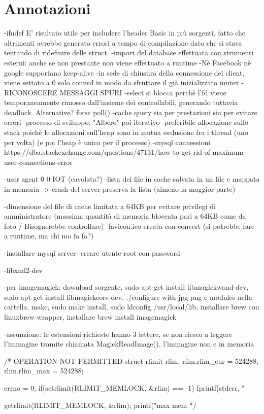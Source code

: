 \documentclass[a4paper, titlepage]{article}
\begin{document}
	\section{Annotazioni}
	\begin{flushleft}
		-ifndef E' risultato utile per includere l'header Basic in più sorgenti, fatto che altrimenti avrebbe generato errori a tempo di compilazione dato che si stava tentando di ridefinire delle struct.\newline
		-import del database effettuata con strumenti esterni: anche se non prestante non viene effettuato a runtime
		-Nè Facebook nè google supportano keep-alive
		-in sede di chiusura della connessione del client, viene settato a 0 solo connsd in modo da sfruttare il già inizializzato mutex
		-RICONOSCERE MESSAGGI SPURI
		-select si blocca perchè l'fd viene temporaneamente rimosso dall'insieme dei controllabili, generando tuttavia deadlock. Alternative? forse poll()
		-cache query sia per prestazioni sia per evitare errori
		-processo di sviluppo: "Albero" poi iterativo
		-preferibile allocazione sullo stack poichè le allocazioni sull'heap sono in mutua esclusione fra i thread (uno per volta) (e poi l'heap è unico per il processo)
		-mysql connessioni https://dba.stackexchange.com/questions/47131/how-to-get-rid-of-maximum-user-connections-error
		
		-user agent 0 0 IOT (cavolata?)
		-lista dei file in cache salvata in un file e mappata in memoria -> crash del server preserva la lista (almeno la maggior parte)
		
		-dimensione del file di cache limitata a 64KB per evitare privilegi di amministratore (massima quantità di memoria bloccata pari a 64KB come da foto / Bisognerebbe controllare)
		-favicon.ico creata con convert (si potrebbe fare a runtime, ma chi mo fa fa?)
		
		-installare mysql server
		-creare utente root con password
		
		-libxml2-dev
		
		-per imagemagick: download sorgente, sudo apt-get install libmagickwand-dev, sudo apt-get install libmagickcore-dev, ./configure with jpg png e modules nella cartella, make, sudo make install, sudo ldconfig /usr/local/lib, installare brew con linuxbrew-wrapper, installare brew install imagemagick


		-assunzione: le estensioni richieste hanno 3 lettere, se non riesco a leggere l'immagine tramite chiamata MagickReadImage(), l'immagine non e in memoria

		/* OPERATION NOT PERMITTED
		struct rlimit rlim;
		rlim.rlim\_cur = 524288;
		rlim.rlim\_max = 524288;

		errno = 0;
		if(setrlimit(RLIMIT\_MEMLOCK, \&rlim) == -1)
		fprintf(stderr, "%

		getrlimit(RLIMIT\_MEMLOCK, \&rlim);
		printf("max mem %
		*/
	\end{flushleft}

	
\end{document}
